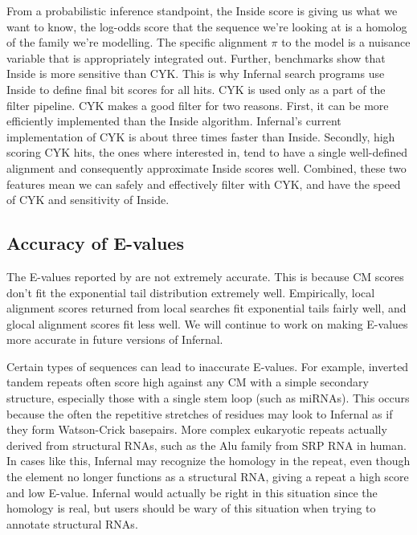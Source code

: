 From a probabilistic inference standpoint, the Inside 
score is giving us what we want to know, the log-odds score that the
sequence we're looking at is a homolog of the family we're
modelling. The specific alignment $\pi$ to the model is a nuisance
variable that is appropriately integrated out. Further, 
benchmarks show that Inside is more sensitive than CYK.
This is why Infernal search programs use Inside to define final bit
scores for all hits. CYK is used only as a part of the filter
pipeline. 
CYK makes a good filter for two reasons. First, it can be
more efficiently implemented than the Inside
algorithm. Infernal's current implementation of CYK is
about three times faster than Inside. Secondly,
high scoring CYK hits, the ones where interested in, tend to have a
single well-defined alignment and consequently approximate Inside
scores well. Combined, these two features mean we can safely and
effectively filter with CYK, and have the speed of CYK and sensitivity
of Inside. 

\subsection{Accuracy of E-values}

The E-values reported by  are not extremely accurate.
This is because CM scores don't fit the exponential tail distribution
extremely well. Empirically, local alignment scores returned from
local searches fit exponential tails fairly well, and glocal alignment
scores fit less well. We will continue to work on making E-values more
accurate in future versions of Infernal.

Certain types of sequences can lead to inaccurate E-values. For
example, inverted
tandem repeats often score high against any CM with a simple secondary
structure, especially those with a single stem loop (such as
miRNAs). This occurs because the often the repetitive stretches of residues
may look to Infernal as if they form Watson-Crick basepairs. 
More complex eukaryotic repeats actually derived from structural RNAs,
such as the Alu family from SRP RNA in human. In cases like this,
Infernal may recognize the homology in the repeat, even though the
element no longer functions as a structural RNA, giving a repeat a
high score and low E-value. Infernal would actually be right in this
situation since the homology is real, but users should be wary of this
situation when trying to annotate structural RNAs. 

